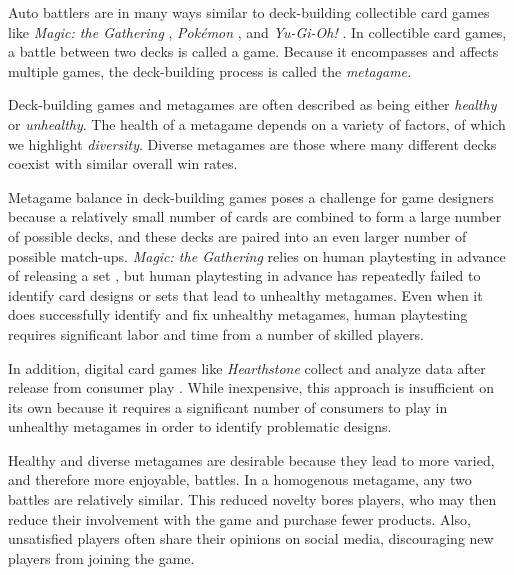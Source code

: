 \documentclass[letterpaper]{article} %
\newcommand{\newterm}[1]{\textit{#1}}
\begin{document}
Auto battlers are in many ways similar to deck-building collectible
card games like \textit{Magic: the Gathering} \cite{magic-the-gathering},
\textit{Pok\'{e}mon} \cite{pokemon-tcg},
and \textit{Yu-Gi-Oh!}
\cite{yugioh-tcg}. In collectible card games, a
battle between two decks is called a game. Because it encompasses and
affects multiple games, the deck-building process is called the
\newterm{metagame.}

Deck-building games and metagames are often described as being either
\newterm{healthy} or \newterm{unhealthy}. The health of a metagame
depends on a variety of factors, of which we highlight
\newterm{diversity}. Diverse metagames are those where many different
decks coexist with similar overall win rates.

Metagame balance in deck-building games poses a challenge for game
designers because a relatively small number of cards are combined
to form a large number of possible decks, and these decks are paired
into an even larger number of possible match-ups. \textit{Magic: the Gathering}
relies on human playtesting in advance of releasing a set
\cite{designing-hod-ffl}, but human playtesting in advance has repeatedly
failed to identify card designs or sets that lead to unhealthy
metagames. Even when it does successfully identify and fix unhealthy
metagames, human playtesting requires significant labor and time from
a number of skilled players.

In addition, digital card games like \textit{Hearthstone} collect and
analyze data after release from consumer play
\cite{blizzard-gamebalancetalk-keg2019}. While inexpensive, this
approach is insufficient on its own because it requires a significant
number of consumers to play in unhealthy metagames in order to
identify problematic designs.


Healthy and diverse metagames are desirable because they lead to more
varied, and therefore more enjoyable, battles. In a homogenous
metagame, any two battles are relatively similar. This reduced novelty
bores players, who may then reduce their involvement with the game and
purchase fewer products. Also, unsatisfied players often share their
opinions on social media, discouraging new players from joining the
game.
\end{document}
